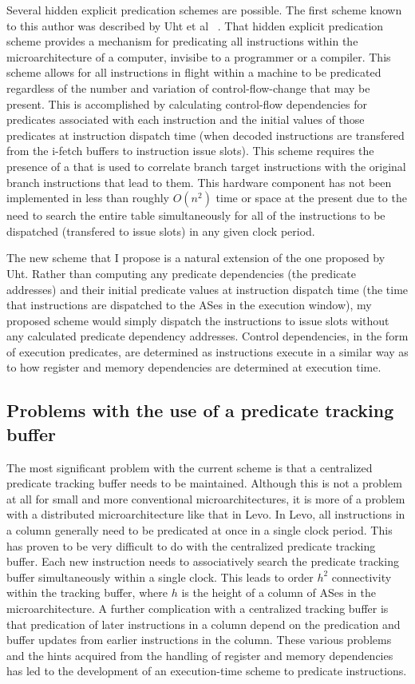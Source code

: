 \documentclass[10pt,dvips]{article}
\begin{document}
Several hidden explicit predication schemes are possible.
The first scheme known to this author was described by 
Uht et al ~\cite{Uht01}.
That hidden explicit predication scheme
provides a
mechanism for predicating all instructions within
the microarchitecture of a computer, invisibe to a programmer or
a compiler.
This scheme allows for all instructions in flight within a
machine to be
predicated regardless of the number and variation of control-flow-change
that may be present.
This is accomplished by calculating control-flow 
dependencies for predicates associated with each instruction
and the initial values of those predicates
at
instruction dispatch time (when decoded instructions are transfered
from the i-fetch buffers to instruction issue slots).
This scheme requires the
presence of a  that is used to correlate branch
target instructions with the original branch instructions that lead to
them.  This hardware component has not been implemented in less than
roughly $ O(n ^ 2) $ time or space at the present due to the need to
search the entire table simultaneously for all of the instructions to
be dispatched (transfered to issue slots) in any given clock period.  

The new scheme that I propose is a natural
extension of the one proposed by Uht.
Rather than computing any predicate dependencies (the predicate addresses)
and their initial predicate values at instruction dispatch time (the time
that instructions are dispatched to the ASes in the execution window), 
my proposed scheme would
simply dispatch the instructions to issue slots without 
any calculated predicate 
dependency addresses.  Control dependencies, in the form of
execution predicates, are determined as
instructions execute in a similar way as to how register and
memory dependencies are determined at execution time.
%
\subsection{Problems with the use of a predicate tracking buffer}
%
The most significant problem with the current scheme is that
a centralized predicate tracking buffer needs to be maintained.
Although this is not a problem at all for small and more conventional
microarchitectures, it is more of a problem with a distributed
microarchitecture like that in Levo.   In Levo, all instructions
in a column generally need to be predicated at once in a single
clock period.  This has proven to be very difficult to do with
the centralized predicate tracking buffer.  Each 
new instruction needs to associatively search the predicate
tracking buffer simultaneously within a single clock.  This
leads to order $ h^2 $ connectivity within the tracking buffer, 
where $ h $ is the height of a column of ASes in the microarchitecture.
A further complication with a centralized tracking buffer
is that predication of later instructions in a column depend on the
predication and buffer updates from earlier instructions in the column.
These various problems and the hints acquired from the handling
of register and memory dependencies has led to the development
of an execution-time scheme to predicate instructions.
%
\end{document}

